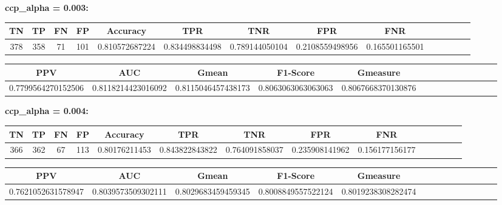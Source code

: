 \documentclass[a4]{article}
\begin{document}
\textbf{ccp\_alpha = 0.003:}
\begin{center}
\begin{tabular}{|c|c|c|c|c|c|c|c|c|c|c|c|c|c|}
\hline
\multicolumn{1}{|c|}{\textbf{TN}}& \textbf{TP} & \textbf{FN} & \textbf{FP} & \textbf{Accuracy} & \textbf{TPR} & \textbf{TNR} & \textbf{FPR} &\textbf{FNR} \\ \hline
  378 & 358 & 71 & 101 & 0.810572687224 & 0.834498834498 & 0.789144050104 & 0.2108559498956 & 0.165501165501 \\ \hline
\end{tabular}
\end{center}

\begin{center}
\begin{tabular}{|c|c|c|c|c|c|c|c|c|c|c|c|c|c|}
\hline
\multicolumn{1}{|c|}{\textbf{PPV}} & \textbf{AUC} & \textbf{Gmean} & \textbf{F1-Score} & \textbf{Gmeasure}  \\ \hline
  0.7799564270152506 & 0.8118214423016092 & 0.8115046457438173 & 0.8063063063063063 & 0.8067668370130876 \\ \hline
\end{tabular}
\end{center}


\newpage
\textbf{ccp\_alpha = 0.004:}
\begin{center}
\begin{tabular}{|c|c|c|c|c|c|c|c|c|c|c|c|c|c|}
\hline
\multicolumn{1}{|c|}{\textbf{TN}}& \textbf{TP} & \textbf{FN} & \textbf{FP} & \textbf{Accuracy} & \textbf{TPR} & \textbf{TNR} & \textbf{FPR} &\textbf{FNR} \\ \hline
  366 & 362 & 67 & 113 & 0.80176211453 & 0.843822843822 & 0.764091858037 & 0.235908141962 & 0.156177156177 \\ \hline
\end{tabular}
\end{center}

\begin{center}
\begin{tabular}{|c|c|c|c|c|c|c|c|c|c|c|c|c|c|}
\hline
\multicolumn{1}{|c|}{\textbf{PPV}} & \textbf{AUC} & \textbf{Gmean} & \textbf{F1-Score} & \textbf{Gmeasure}  \\ \hline
  0.7621052631578947 & 0.8039573509302111 & 0.8029683459459345 & 0.8008849557522124 & 0.8019238308282474 \\ \hline
\end{tabular}
\end{center}
\end{document}
